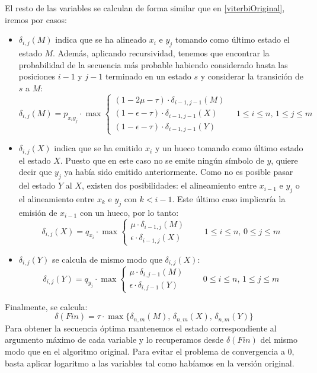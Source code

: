 El resto de las variables se calculan de forma similar que en \eqref{viterbiOriginal}, iremos por casos:
\begin{itemize}
    \item $\delta_{i,j}(M)$ indica que se ha alineado $x_i$ e $y_j$ tomando como último estado el estado $M$. Además, aplicando recursividad, tenemos que encontrar la probabilidad de la secuencia más probable habiendo considerado hasta las posiciones $i-1$ y $j-1$ terminado en un estado $s$ y considerar la transición de $s$ a $M$:
    \[\delta_{i,j}(M)=p_{x_iy_j}\cdot \max
    \begin{cases}
        (1-2\mu-\tau)\cdot\delta_{i-1,j-1}(M) \\
        (1-\epsilon-\tau)\cdot\delta_{i-1,j-1}(X) \\
        (1-\epsilon-\tau)\cdot\delta_{i-1,j-1}(Y)
    \end{cases} \quad 1\leq i\leq n, \, 1\leq j \leq m\] 

    \item $\delta_{i,j}(X)$ indica que se ha emitido $x_i$ y un hueco tomando como último estado el estado $X$. Puesto que en este caso no se emite ningún símbolo de $y$, quiere decir que $y_j$ ya había sido emitido anteriormente. Como no es posible pasar del estado $Y$ al $X$, existen dos posibilidades: el alineamiento entre $x_{i-1}$ e $y_j$ o el alineamiento entre $x_k$ e $y_j$ con $k<i-1$. Este último caso implicaría la emisión de $x_{i-1}$ con un hueco, por lo tanto:
    \[\delta_{i,j}(X)=q_{x_i}\cdot \max 
    \begin{cases}
        \mu\cdot\delta_{i-1,j}(M) \\
        \epsilon\cdot\delta_{i-1,j}(X) 
    \end{cases} \qquad 1\leq i\leq n, \, 0\leq j \leq m\]

    \item $\delta_{i,j}(Y)$ se calcula de mismo modo que $\delta_{i,j}(X)$:
    \[\delta_{i,j}(Y)=q_{y_j}\cdot \max 
    \begin{cases}
        \mu\cdot\delta_{i,j-1}(M) \\
        \epsilon\cdot\delta_{i,j-1}(Y) 
    \end{cases} \qquad 0\leq i\leq n, \, 1\leq j \leq m \]
\end{itemize}
Finalmente, se calcula:
\[\delta(Fin)=\tau\cdot\max\{\delta_{n,m}(M),\,\delta_{n,m}(X),\,\delta_{n,m}(Y)\}\]
Para obtener la secuencia óptima mantenemos el estado correspondiente al argumento máximo de cada variable y lo recuperamos desde $\delta(Fin)$ del mismo modo que en el algoritmo original. Para evitar el problema de convergencia a $0$, basta aplicar logaritmo a las variables tal como habíamos en la versión original.


